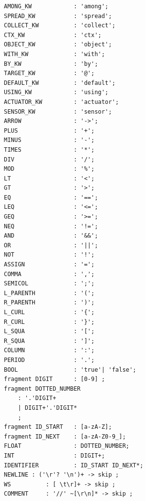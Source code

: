 \documentclass{article}
\begin{document}
\begin{verbatim}
AMONG_KW            : 'among';
SPREAD_KW           : 'spread';
COLLECT_KW          : 'collect';
CTX_KW              : 'ctx';
OBJECT_KW           : 'object';
WITH_KW             : 'with';
BY_KW               : 'by';
TARGET_KW           : '@';
DEFAULT_KW          : 'default';
USING_KW            : 'using';
ACTUATOR_KW         : 'actuator';
SENSOR_KW           : 'sensor';
ARROW               : '->';
PLUS                : '+';
MINUS               : '-';
TIMES               : '*';
DIV                 : '/';
MOD                 : '%';
LT                  : '<';
GT                  : '>';
EQ                  : '==';
LEQ                 : '<=';
GEQ                 : '>=';
NEQ                 : '!=';
AND                 : '&&';
OR                  : '||';
NOT                 : '!';
ASSIGN              : '=';
COMMA               : ',';
SEMICOL             : ';';
L_PARENTH           : '(';
R_PARENTH           : ')';
L_CURL              : '{';
R_CURL              : '}';
L_SQUA              : '[';
R_SQUA              : ']';
COLUMN              : ':';
PERIOD              : '.';
BOOL                : 'true'| 'false';
fragment DIGIT      : [0-9] ;
fragment DOTTED_NUMBER
    : '.'DIGIT+
    | DIGIT+'.'DIGIT*
    ;
fragment ID_START   : [a-zA-Z];
fragment ID_NEXT    : [a-zA-Z0-9_];
FLOAT               : DOTTED_NUMBER;
INT                 : DIGIT+;
IDENTIFIER          : ID_START ID_NEXT*;
NEWLINE : ('\r'? '\n')+ -> skip ;
WS          : [ \t\r]+ -> skip ;
COMMENT     : '//' ~[\r\n]* -> skip ;
\end{verbatim}
\end{document}
